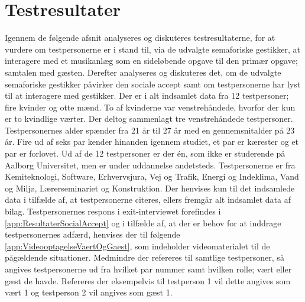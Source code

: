 \chapter{Testresultater}
\label{TestresultaterSocialAccept}
%
Igennem de følgende afsnit analyseres og diskuteres testresultaterne, for at vurdere om testpersonerne er i stand til, via de udvalgte semaforiske gestikker, at interagere med et musikanlæg som en sideløbende opgave til den primær opgave; samtalen med gæsten. Derefter analyseres og diskuteres det, om de udvalgte semaforiske gestikker påvirker den sociale accept samt om testpersonerne har lyst til at interagere med gestikker.\blankline
%
Der er i alt indsamlet data fra 12 testpersoner; fire kvinder og otte mænd. To af kvinderne var venstrehåndede, hvorfor der kun er to kvindlige værter. Der deltog sammenlagt tre venstrehåndede testpersoner. Testpersonernes alder spænder fra 21 år til 27 år med en gennemsnitalder på 23 år. Fire ud af seks par kender hinanden igennem studiet, et par er kærester og et par er forlovet. Ud af de 12 testpersoner er der én, som ikke er studerende på Aalborg Universitet, men er under uddannelse andetsteds. Testpersonerne er fra Kemiteknologi, Software, Erhvervsjura, Vej og Trafik, Energi og Indeklima, Vand og Miljø, Lærerseminariet og Konstruktion. Der henvises kun til det indsamlede data i tilfælde af, at testpersonerne citeres, ellers fremgår alt indsamlet data af bilag. Testpersonernes respons i exit-interviewet forefindes i \autoref{app:ResultaterSocialAccept} og i tilfælde af, at der er behov for at inddrage testpersonernes adfærd, henvises der til følgende \autoref{app:VideooptagelseVaertOgGaest}, som indeholder videomaterialet til de pågældende situationer. Medmindre der refereres til samtlige testpersoner, så angives testpersonerne ud fra hvilket par nummer samt hvilken rolle; vært eller gæst de havde. Refereres der eksempelvis til testperson 1 vil dette angives som vært 1 og testperson 2 vil angives som gæst 1. 



